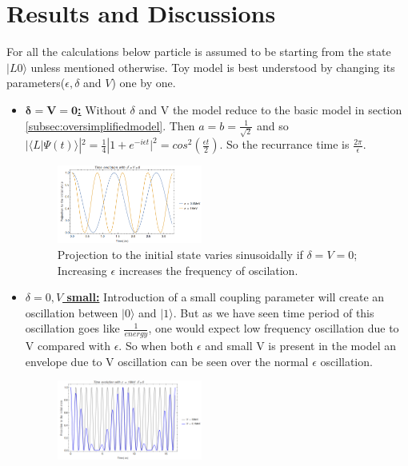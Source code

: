 \documentclass[a4paper,two column]{article}
\begin{document}
        \section{Results and Discussions}\label{sec:results}
            For all the calculations below particle is assumed to be starting from the state $|L0\rangle$ unless mentioned otherwise. Toy model is best understood by changing its parameters($\epsilon,\delta $ and $V$) one by one.\\
            \begin{itemize}
            \item \underline{\textbf{$\mathbf{\delta = V = 0}$:}} Without $\delta$ and V the model reduce to the basic model in section \ref{subsec:oversimplifiedmodel}. Then $a=b=\frac{1}{\sqrt{2}}$ and so 
            $|\langle L |\Psi(t)\rangle|^2 = \frac{1}{4}|1 + e^{-i\epsilon t}|^2 = cos^2(\frac{\epsilon t}{2})$. So  the recurrance time is $\frac{2\pi}{\epsilon}$. 
            \begin{figure}[H]
                \centering
                \includegraphics[width=0.45\textwidth,fbox]{image/twowell_epsilon1del0V0}
                \caption{Projection to the initial state varies sinusoidally if $\delta = V = 0$; Increasing $\epsilon$ increases the frequency of oscilation.}
                \label{fig:epsilonoscillation}
            \end{figure}
            \item \underline{\textbf{$\delta=0,V$ small:}} Introduction of a small coupling parameter will create an oscillation between $|0\rangle$ and $|1\rangle$. But as we have seen time period of this oscillation goes like $\frac{1}{energy}$, one would expect low frequency oscillation due to V compared with $\epsilon$. So when both $\epsilon$ and small V is present in the model an envelope due to V oscillation can be seen over the normal $\epsilon$ oscillation.
            \begin{figure}[H]
                \centering
                \includegraphics[width=0.45\textwidth,fbox]{image/twowell_epsilon1del0V}

\end{figure}
\end{itemize}
\end{document}
